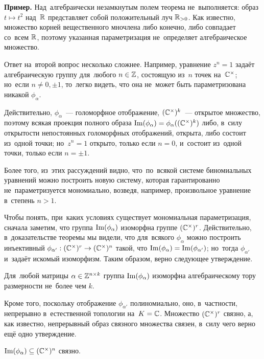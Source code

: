 \documentclass[a4paper,oneside]{article}
\begin{document}
\noindent\textbf{Пример.} Над~алгебраически незамкнутым полем теорема не~выполняется: образ $t \mapsto t^2$ над~$\mathbb{R}$
представляет собой положительный луч $\mathbb{R}_{>0}$. Как известно, множество корней вещественного мночлена либо конечно,
либо совпадает со~всем $\mathbb{R}$, поэтому указанная параметризация не~определяет алгебраическое множество.
\medskip

Ответ на~второй вопрос несколько сложнее. Например, уравнение $z^n = 1$ задаёт алгебраическую
группу для~любого $n \in \mathbb{Z}$, состоящую из~$n$ точек на~$\mathbb{C}^\times$; но~если $n \neq 0, \pm 1$,
то~легко видеть, что она не~может быть параметризована никакой $\phi_\alpha$.

Действительно, $\phi_\alpha$~— голоморфное отображение, $(\mathbb{C}^\times)^k$~— открытое множество,
поэтому всякая проекция полного образа $\mathrm{Im}(\phi_\alpha) = \phi_\alpha((\mathbb{C}^\times)^k)$ либо, в~силу
открытости непостоянных голоморфных отображений, открыта, либо состоит из~одной точки; но~$z^n = 1$
открыто, только если $n = 0$, и~состоит из~одной точки, только если $n = \pm 1$.

Более того, из~этих рассуждений видно, что~по~всякой системе биномиальных уравнений можно построить новую систему,
которая гарантированно не~параметризуется мономиально, возведя, например, произвольное уравнение в~степень $n > 1$.

Чтобы понять, при~каких условиях существует мономиальная параметризация, сначала заметим, что группа $\mathrm{Im}(\phi_\alpha)$
изоморфна группе $(\mathbb{C}^\times)^r$. Действительно, в~доказательстве теоремы мы видели, что для~всякого $\phi_\alpha$
можно построить инъективный $\phi_{\alpha'} : (\mathbb{C}^\times)^r \rightarrow (\mathbb{C}^\times)^n$ такой, что $\mathrm{Im}(\phi_\alpha) = \mathrm{Im}(\phi_{\alpha'})$;
но~тогда $\phi_{\alpha'}$ и~задаёт искомый изоморфизм. Таким образом, верно следующее утверждение.

\begin{statement*}
    Для~любой матрицы $\alpha \in \mathbb{Z}^{n \times k}$ группа $\mathrm{Im}(\phi_\alpha)$ изоморфна алгебраическому тору размерности не~более чем $k$.
\end{statement*}

Кроме того, поскольку отображение $\phi_{\alpha'}$ полиномиально, оно, в~частности, непрерывно в~естественной топологии на~$K = \mathbb{C}$.
Множество $(\mathbb{C}^\times)^r$ связно, а, как известно, непрерывный образ связного множества связен, в~силу чего верно ещё одно утверждение.

\begin{statement*}
    $\mathrm{Im}(\phi_\alpha) \subseteq (\mathbb{C}^\times)^n$ связно.
\end{statement*}
\end{document}
